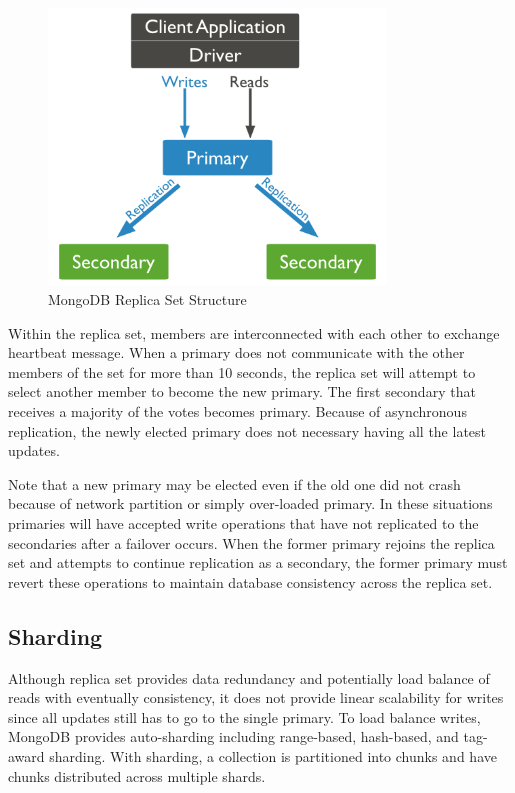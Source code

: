 \documentclass[11pt]{book}
\begin{document}
\begin{figure}[t]
\includegraphics[width=0.8\textwidth]{images/mongodb-replica-set.png}
\centering
\caption{MongoDB Replica Set Structure}
\end{figure}

Within the replica set, members are interconnected with each other to exchange heartbeat message. When a primary does not communicate with the other members of the set for more than 10 seconds, the replica set will attempt to select another member to become the new primary. The first secondary that receives a majority of the votes becomes primary. Because of asynchronous replication, the newly elected primary does not necessary having all the latest updates.

Note that a new primary may be elected even if the old one did not crash because of network partition or simply over-loaded primary. In these situations primaries will have accepted write operations that have not replicated to the secondaries after a failover occurs. When the former primary rejoins the replica set and attempts to continue replication as a secondary, the former primary must revert these operations to maintain database consistency across the replica set.

\subsection{Sharding}

Although replica set provides data redundancy and potentially load balance of reads with eventually consistency, it does not provide linear scalability for writes since all updates still has to go to the single primary. To load balance writes, MongoDB provides auto-sharding including range-based, hash-based, and tag-award sharding. With sharding, a collection is partitioned into chunks and have chunks distributed across multiple shards.
\end{document}
